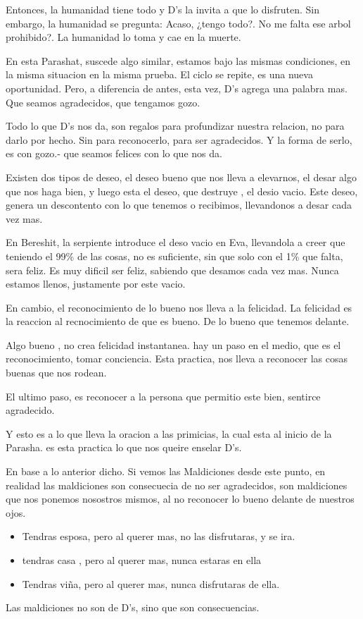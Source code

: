 \documentclass[conference]{IEEEtran}
\begin{document}
Entonces, la humanidad tiene todo y D's  la invita a que lo disfruten. Sin embargo, la humanidad se pregunta: Acaso, ¿tengo todo?. No me falta ese arbol prohibido?. La humanidad lo toma y cae en la muerte.

En esta Parashat, suscede algo similar, estamos bajo las mismas condiciones, en la misma situacion  en la misma prueba. 
El ciclo se repite, es una nueva oportunidad. Pero, a diferencia de antes, esta vez, D's agrega una palabra mas. Que seamos agradecidos, que tengamos gozo.

Todo lo que D's nos da, son regalos para profundizar nuestra relacion, no para darlo por hecho. Sin para reconocerlo, para ser agradecidos. Y la forma de serlo, es con gozo.- que seamos felices con lo que nos da.

Existen dos tipos de deseo, el deseo bueno que nos lleva a elevarnos, el desar algo que nos haga bien, y luego esta el deseo, que destruye , el desio vacio. Este deseo, genera un descontento con lo que tenemos o recibimos, llevandonos a desar cada vez mas.


En Bereshit, la serpiente introduce el deso vacio en Eva, llevandola a creer que teniendo el 99\% de las cosas, no es suficiente, sin que solo con el 1\% que falta, sera feliz. 
Es muy dificil ser feliz, sabiendo que desamos cada vez mas. Nunca estamos llenos, justamente por este vacio. 


En cambio, el reconocimiento de lo bueno nos lleva a la felicidad. La felicidad es la reaccion al recnocimiento de que es bueno. De lo bueno que tenemos delante. 

Algo bueno  , no crea felicidad instantanea. hay un paso en el medio, que es el reconocimiento, tomar conciencia. Esta practica, nos lleva a reconocer las cosas buenas que nos rodean.

El ultimo paso, es reconocer a la persona que permitio este bien, sentirce agradecido. 

Y esto es a lo que lleva la oracion a las primicias, la cual esta al inicio de la Parasha. es esta practica lo que nos queire enselar D's.

En base   a lo anterior dicho. Si vemos las Maldiciones desde este punto, en realidad las maldiciones son consecuecia de no ser agradecidos, son maldiciones que nos ponemos nosostros mismos, al no reconocer lo bueno delante de nuestros ojos.

\begin{itemize}
\item Tendras esposa, pero al querer mas, no las disfrutaras, y se ira.
\item tendras casa , pero al querer mas, nunca estaras en ella
\item Tendras viña, pero al querer mas, nunca disfrutaras de ella.
\end{itemize}
Las maldiciones no son de D's, sino que son consecuencias.
\end{document}
